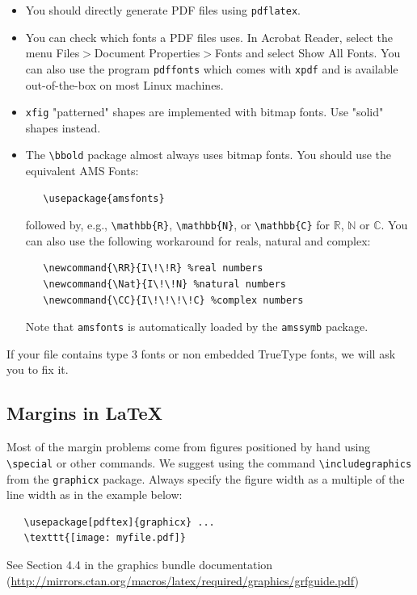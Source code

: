 \documentclass{article}
\begin{document}
\begin{CJK}{UTF8}{gbsn}
\begin{itemize}


\item You should directly generate PDF files using \verb+pdflatex+.


\item You can check which fonts a PDF files uses.  In Acrobat Reader, select the
  menu Files$>$Document Properties$>$Fonts and select Show All Fonts. You can
  also use the program \verb+pdffonts+ which comes with \verb+xpdf+ and is
  available out-of-the-box on most Linux machines.


\item \verb+xfig+ "patterned" shapes are implemented with bitmap fonts.  Use
  "solid" shapes instead.


\item The \verb+\bbold+ package almost always uses bitmap fonts.  You should use
  the equivalent AMS Fonts:
\begin{verbatim}
   \usepackage{amsfonts}
\end{verbatim}
followed by, e.g., \verb+\mathbb{R}+, \verb+\mathbb{N}+, or \verb+\mathbb{C}+
for $\mathbb{R}$, $\mathbb{N}$ or $\mathbb{C}$.  You can also use the following
workaround for reals, natural and complex:
\begin{verbatim}
   \newcommand{\RR}{I\!\!R} %real numbers
   \newcommand{\Nat}{I\!\!N} %natural numbers
   \newcommand{\CC}{I\!\!\!\!C} %complex numbers
\end{verbatim}
Note that \verb+amsfonts+ is automatically loaded by the \verb+amssymb+ package.


\end{itemize}


If your file contains type 3 fonts or non embedded TrueType fonts, we will ask
you to fix it.


\subsection{Margins in \LaTeX{}}


Most of the margin problems come from figures positioned by hand using
\verb+\special+ or other commands. We suggest using the command
\verb+\includegraphics+ from the \verb+graphicx+ package. Always specify the
figure width as a multiple of the line width as in the example below:
\begin{verbatim}
   \usepackage[pdftex]{graphicx} ...
   \texttt{[image: myfile.pdf]}
\end{verbatim}
See Section 4.4 in the graphics bundle documentation
(\url{http://mirrors.ctan.org/macros/latex/required/graphics/grfguide.pdf})



\end{CJK}
\end{document}
